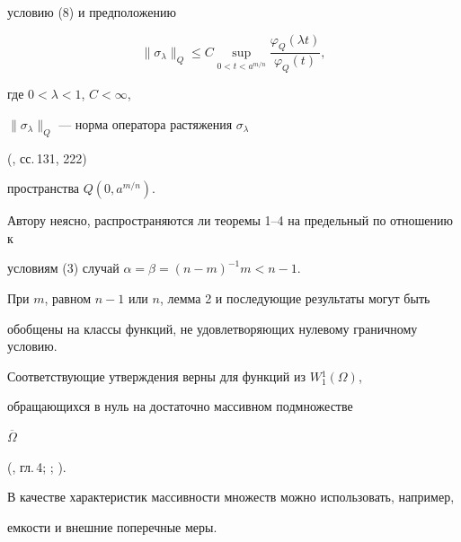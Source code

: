 условию (8) и предположению 


$$ 


\|\sigma_\lambda\|_Q \le C\sup_{0<t<a^{m/n}} 


\frac{\varphi_Q(\lambda t)}{\varphi_Q(t)}, 


$$ 


где $0<\lambda<1$, $C<\infty$, 


$\|\sigma_\lambda\|_Q$ --- норма оператора растяжения $\sigma_\lambda$ 


(\cite{Kre}, сс.\,131, 222) 


пространства $Q(0,a^{m/n})$. 


Автору неясно, распространяются ли теоремы 1--4 на предельный по отношению к 


условиям (3) случай $\alpha=\beta=(n-m)^{-1}m<n-1$. 


 


При $m$, равном $n-1$ или $n$, лемма 2 и последующие результаты могут быть 


обобщены на классы функций, не удовлетворяющих нулевому граничному условию. 


Соответствующие утверждения верны для функций из $W{}^1_1(\Omega)$, 


обращающихся в нуль на достаточно массивном подмножестве 


$\overline\Omega$ 


(\cite{Maz}, гл.\,4; \cite{Sob}; \cite{Kli1}). 


В качестве характеристик массивности множеств можно использовать, например, 


емкости и внешние поперечные меры.


 


 


